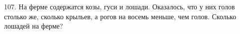 107. На ферме содержатся козы, гуси и лошади. Оказалось, что у них голов столько же, сколько крыльев, а рогов на восемь меньше, чем голов. Сколько лошадей на ферме?\\
